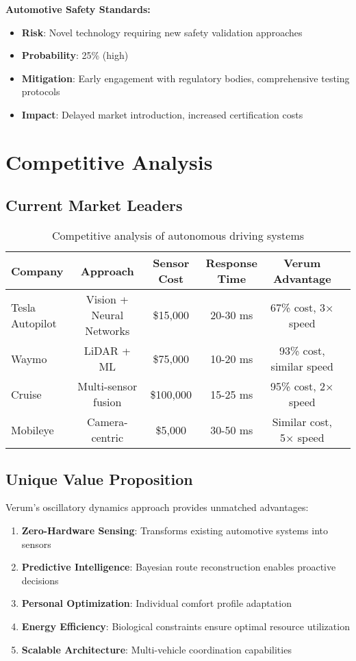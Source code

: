\documentclass[11pt,a4paper]{article}
\begin{document}
\textbf{Automotive Safety Standards:}
\begin{itemize}
    \item \textbf{Risk}: Novel technology requiring new safety validation approaches
    \item \textbf{Probability}: 25\% (high)
    \item \textbf{Mitigation}: Early engagement with regulatory bodies, comprehensive testing protocols
    \item \textbf{Impact}: Delayed market introduction, increased certification costs
\end{itemize}

\section{Competitive Analysis}

\subsection{Current Market Leaders}

\begin{table}[H]
\centering
\begin{tabular}{@{}lccccc@{}}
\toprule
\textbf{Company} & \textbf{Approach} & \textbf{Sensor Cost} & \textbf{Response Time} & \textbf{Verum Advantage} \\
\midrule
Tesla Autopilot & Vision + Neural Networks & \$15,000 & 20-30 ms & 67\% cost, 3× speed \\
Waymo & LiDAR + ML & \$75,000 & 10-20 ms & 93\% cost, similar speed \\
Cruise & Multi-sensor fusion & \$100,000 & 15-25 ms & 95\% cost, 2× speed \\
Mobileye & Camera-centric & \$5,000 & 30-50 ms & Similar cost, 5× speed \\
\bottomrule
\end{tabular}
\caption{Competitive analysis of autonomous driving systems}
\label{tab:competitive_analysis}
\end{table}

\subsection{Unique Value Proposition}

Verum's oscillatory dynamics approach provides unmatched advantages:

\begin{enumerate}
    \item \textbf{Zero-Hardware Sensing}: Transforms existing automotive systems into sensors
    \item \textbf{Predictive Intelligence}: Bayesian route reconstruction enables proactive decisions
    \item \textbf{Personal Optimization}: Individual comfort profile adaptation
    \item \textbf{Energy Efficiency}: Biological constraints ensure optimal resource utilization
    \item \textbf{Scalable Architecture}: Multi-vehicle coordination capabilities
\end{enumerate}
\end{document}
